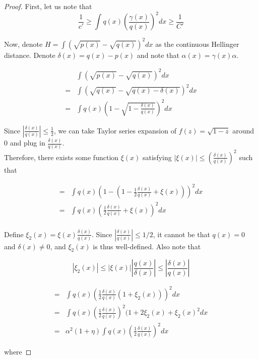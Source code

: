 \documentclass{article}
\begin{document}
\begin{proof}
First, let us note that
\[
\frac{1}{c'} \geq \int q(x) \left( \frac{\gamma(x)}{q(x)} \right)^2 dx \geq \frac{1}{C'}
\]

Now, denote $H = \int (\sqrt{p(x)} - \sqrt{q(x)})^2 dx$ as the continuous Hellinger distance. Denote $\delta(x) = q(x) - p(x)$ and note that $\alpha(x) = \gamma(x) \alpha$. 

\begin{align*}
  &\int (\sqrt{p(x)} - \sqrt{q(x)})^2 dx \\
=& \int ( \sqrt{q(x)} - \sqrt{q(x) - \delta(x)} )^2 dx \\
=& \int q(x) \left( 1 - \sqrt{ 1 - \frac{\delta(x)}{q(x)}} \right)^2 dx 
\end{align*}

Since $\left| \frac{\delta(x)}{q(x)} \right| \leq \frac{1}{2}$, we can take Taylor series expansion of $f(z) = \sqrt{1 - z}$ around 0 and plug in $\frac{\delta(x)}{q(x)}$. \\


Therefore, there exists some function $\xi(x)$ satisfying $|\xi(x)| \leq \left( \frac{\delta(x)}{q(x)} \right)^2$ such that

\begin{align*}
=& \int q(x) \left( 1 - (1 - \frac{1}{2} \frac{\delta(x)}{q(x)} + \xi(x) ) \right)^2 dx \\
=& \int q(x) \left( \frac{1}{2} \frac{\delta(x)}{q(x)} + \xi(x) \right)^2 dx\\
\end{align*}

Define $\xi_2(x) = \xi(x) \frac{\delta(x)}{q(x)}$. Since $| \frac{\delta(x)}{q(x)} | \leq 1/2$, it cannot be that $q(x) = 0$ and $\delta(x) \neq 0$, and $\xi_2(x)$ is thus well-defined. Also note that 

\[
|\xi_2(x)| \leq |\xi(x)| \left| \frac{q(x)}{\delta(x)} \right| \leq
   \left| \frac{\delta(x)}{q(x)} \right|
\]

\begin{align*}
=& \int q(x) \left( \frac{1}{2} \frac{\delta(x)}{q(x)} (1 + \xi_2(x)) \right)^2 dx\\
=& \int q(x) \left( \frac{1}{2} \frac{\delta(x)}{q(x)} \right)^2 (1 + 2 \xi_2(x) + \xi_2(x)^2 dx\\
=& \alpha^2 (1 + \eta) \int q(x) \left( \frac{1}{2} \frac{\delta(x)}{q(x)} \right)^2 dx
\end{align*}


where 


\end{proof}
\end{document}

